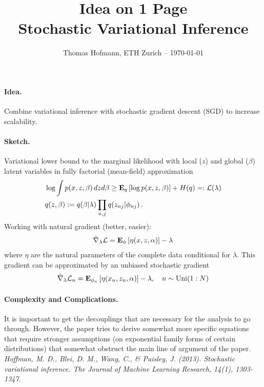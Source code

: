 \documentclass{article}
\title{{\large Idea on {\LARGE 1} Page} \\Stochastic Variational Inference}
\author{Thomas Hofmann, ETH Zurich -- \today}
\date{}
\newcommand{\E}{{\bf E}}
\newcommand{\loglike}{{\mathcal L}}
\begin{document}
\maketitle 

\paragraph*{Idea.} Combine variational inference with stochastic gradient descent (SGD) to increase scalability. 
\paragraph*{Sketch.} Variational lower bound to the marginal likelihood with local ($z$) and global ($\beta$) latent variables   in fully factorial (mean-field) approximation 
\begin{align}
& \log \int p(x,z, \beta) \,  dz d \beta\geq \E_q\left[ \log p(x,z,\beta) \right] + H(q) =: \loglike(\lambda)\\ 
& q(z,\beta) := q(\beta| \lambda) \prod_{n,j} q(z_{nj} | \phi_{nj}) \,.
\end{align}
Working with natural gradient (better,  easier): 
\begin{align}
\hat \nabla_\lambda \loglike = \E_\phi \left[ \eta(x,z,\alpha) \right] - \lambda 
\end{align}
where $\eta$ are the natural parameters of the complete data conditional for $\lambda$. This gradient can be approximated by an unbiased stochastic gradient 
\begin{align}
\hat \nabla_\lambda \loglike_n = \E_{\phi_n} \left[ \eta(x_n,z_n,\alpha) \right] - \lambda, \quad n \sim \text{Uni}(1:N)
\end{align}

\paragraph{Complexity and Complications.} It is important to get the decouplings that are necessary for the analysis to go through. However, the paper tries to derive somewhat more specific equations that require stronger assumptions (on exponential family forms of certain distributions) that somewhat obstruct the main line of argument of the paper. \\[5mm]

\textit{Hoffman, M. D., Blei, D. M., Wang, C., \& Paisley, J. (2013). Stochastic variational inference. The Journal of Machine Learning Research, 14(1), 1303-1347.}
\end{document}
